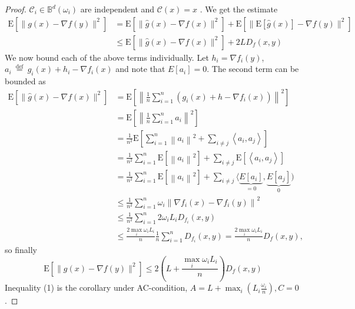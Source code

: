 \documentclass[12pt,a4paper]{article}
\begin{document}
	\begin{proof}
	 $\mathcal{C}_{i} \in \mathbb{B}^{d}\left(\omega_{i}\right)$ are independent and $\mathcal{C}(x)=x$ . We get the estimate
		$$
		\begin{aligned}
			\mathrm{E}\left[\|g(x)-\nabla f(y)\|^{2}\right] &= \mathrm{E}\left[\|\hat{g}(x)-\nabla f(x)\|^{2}\right]+\mathrm{E}\left[\|\mathrm{E}\left[\hat{g}(x)\right]-\nabla f(y)\|^{2}\right]\\
			&\leq \mathrm{E}\left[\|\hat{g}(x)-\nabla f(x)\|^{2}\right]+2LD_f(x,y)
		\end{aligned}
		$$
		We now bound each of the above terms individually. Let $h_i=\nabla f_i(y)$, $a_{i} \stackrel{\text { def }}{=} g_{i}(x)+h_i-\nabla f_{i}(x)$ and note that $E\left[a_{i}\right]=0$. The second term can be bounded as
		$$
		\begin{aligned}
			\mathrm{E}\left[\|\hat{g}(x)-\nabla f(x)\|^{2}\right] &{=} \mathrm{E}\left[\left\|\frac{1}{n} \sum_{i=1}^{n}\left(g_{i}(x)+h-\nabla f_{i}(x)\right)\right\|^{2}\right] \\
			&  =\mathrm{E}\left[\left\|\frac{1}{n} \sum_{i=1}^{n} a_{i}\right\|^{2}\right] \\
			&  {=} \frac{1}{n^{2}} \mathrm{E}\left[\sum_{i=1}^{n}\left\|a_{i}\right\|^{2}+\sum_{i \neq j}\left\langle a_{i}, a_{j}\right\rangle\right] \\
			&  =\frac{1}{n^{2}} \sum_{i=1}^{n} \mathrm{E}\left[\left\|a_{i}\right\|^{2}\right]+\sum_{i \neq j} \mathrm{E}\left[\left\langle a_{i}, a_{j}\right\rangle\right] \\
			&  {=} \frac{1}{n^{2}} \sum_{i=1}^{n} \mathrm{E}\left[\left\|a_{i}\right\|^{2}\right]+\sum_{i \neq j}\langle\underbrace{E\left[a_{i}\right]}_{=0}, \underbrace{E\left[a_{j}\right]}_{0}) \\
			&{\leq} \frac{1}{n^{2}} \sum_{i=1}^{n} \omega_{i}\left\|\nabla f_{i}(x)-\nabla f_i(y)\right\|^{2}\\
			&\leq  \frac{1}{n^{2}} \sum_{i=1}^{n} 2\omega_{i}L_iD_{f_i}(x,y)\\
			&\leq \frac{2\max_{i}\omega_{i}L_i}{n}\frac{1}{n}\sum_{i=1}^nD_{f_i}(x,y)=\frac{2\max_{i}\omega_{i}L_i}{n}D_{f}(x,y),
		\end{aligned}
		$$
		so finally 
		$$
			\mathrm{E}\left[\|g(x)-\nabla f(y)\|^{2}\right] \leq 2(L+\frac{\max_i\omega_{i}L_i}{n})D_{f}(x,y)
		$$
		Inequality (1) is the corollary under AC-condition, $A=L+ \max _{i}\left(L_{i} \frac{\omega_{i}}{n}\right),C=0$.
	\end{proof}	
\end{document}
